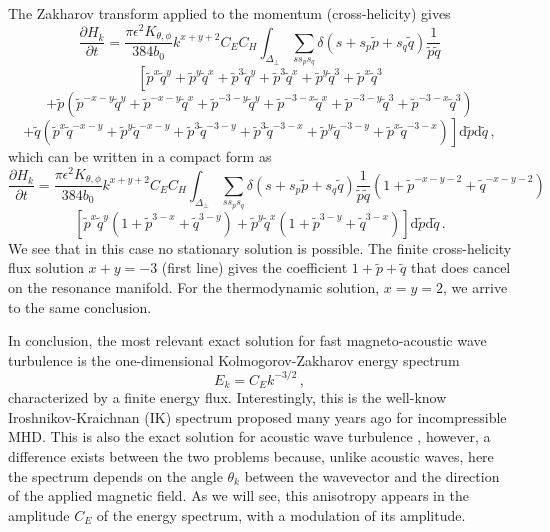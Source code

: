 \documentclass{jpp}
\def\be{\begin{equation}}
\def\ee{\end{equation}}
\def\dd{\mathrm{d}}
\begin{document}
The Zakharov transform applied to the momentum (cross-helicity) gives
\be \label{kinH2}
\frac{\partial H_k}{\partial t} = 
\frac{\pi \epsilon^{2} K_{\theta,\phi}}{384 b_0} k^{x+y+2} C_E C_H \int_{\Delta_\perp} \sum_{ss_{p} s_{q}}  
\delta(s+s_p \tilde p+s_q \tilde q)\frac{1}{\tilde p \tilde q} 
\ee
$$
\left[ {\tilde p}^x {\tilde q}^y + {\tilde p}^y {\tilde q}^x + {\tilde p}^3 {\tilde q}^y +{\tilde p}^3 {\tilde q}^x + {\tilde p}^y {\tilde q}^3 + {\tilde p}^x {\tilde q}^3 \right.
$$
$$
+ \tilde p ({\tilde p}^{-x-y} {\tilde q}^y + {\tilde p}^{-x-y} {\tilde q}^x + {\tilde p}^{-3-y} {\tilde q}^y + {\tilde p}^{-3-x} {\tilde q}^x + {\tilde p}^{-3-y} {\tilde q}^3 
+ {\tilde p}^{-3-x} {\tilde q}^3)
$$
$$
\left. + \tilde q ({\tilde p}^x {\tilde q}^{-x-y} + {\tilde p}^y {\tilde q}^{-x-y} + {\tilde p}^{3} {\tilde q}^{-3-y} + {\tilde p}^3 {\tilde q}^{-3-x} + {\tilde p}^y {\tilde q}^{-3-y} 
+ {\tilde p}^x {\tilde q}^{-3-x}) \right]
\dd {\tilde p} \dd {\tilde q} \, ,
$$
which can be written in a compact form as
\be \label{kinH2}
\frac{\partial H_k}{\partial t} = 
\frac{\pi \epsilon^{2} K_{\theta,\phi}}{384 b_0} k^{x+y+2} C_E C_H \int_{\Delta_\perp} \sum_{ss_{p} s_{q}}  
\delta(s+s_p \tilde p+s_q \tilde q)\frac{1}{\tilde p \tilde q} \left( 1+ {\tilde p}^{-x-y-2} + {\tilde q}^{-x-y-2} \right) 
\ee
$$
\left[ {\tilde p}^x {\tilde q}^y \left(1+ {\tilde p}^{3-x} + {\tilde q}^{3-y} \right) 
+  {\tilde p}^y {\tilde q}^x \left(1+ {\tilde p}^{3-y} + {\tilde q}^{3-x} \right) \right]
\dd {\tilde p} \dd {\tilde q} \, . 
$$
We see that in this case no stationary solution is possible. The finite cross-helicity flux solution $x+y=-3$ (first line) gives the coefficient $1+ {\tilde p} + {\tilde q}$ that does cancel on the resonance manifold. For the thermodynamic solution, $x=y=2$, we arrive to the same conclusion. 

In conclusion, the most relevant exact solution for fast magneto-acoustic wave turbulence is the one-dimensional Kolmogorov-Zakharov energy spectrum 
\be \label{KZS}
E_k = C_E k^{-3/2} \, ,
\ee
characterized by a finite energy flux. 
Interestingly, this is the well-know Iroshnikov-Kraichnan (IK) spectrum \citep{Iroshnikov64,Kraichnan65} proposed many years ago for incompressible MHD. This is also the exact solution for acoustic wave turbulence \citep{Zakharov1970}, however, a difference exists between the two problems because, unlike acoustic waves, here the spectrum depends on the angle $\theta_k$ between the wavevector and the direction of the applied magnetic field. As we will see, this anisotropy appears in the amplitude $C_E$ of the energy spectrum, with a modulation of its amplitude. 
\end{document}
